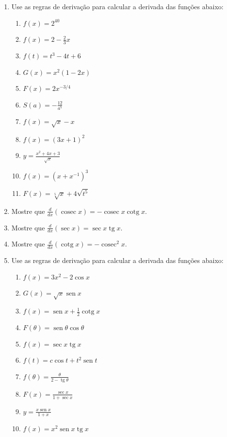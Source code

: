 \documentclass[a4paper]{article}
\DeclareMathOperator{\sen}{sen}
\DeclareMathOperator{\tg}{tg}
\DeclareMathOperator{\cotg}{cotg}
\DeclareMathOperator{\cosec}{cosec}
\newcommand{\ds}{\displaystyle}
\begin{document}
%
%
\begin{enumerate}
    \vspace{0.5cm}
    \item Use as regras de deriva\c{c}\~ao para calcular a derivada das fun\c{c}\~oes abaixo:

        \begin{enumerate}
            \item $f(x)=2^{40}$
            \item $f(x)=2-\frac{2}{3}x$
            \item $f(t)=t^3-4t+6$
            \item $G(x)=x^2(1-2x)$
            \item $F(x)=2x^{-3/4}$
            \item $S(a)=-\frac{12}{a^5}$
            \item $f(x)=\sqrt{x}-x$
            \item $f(x)=(3x+1)^2$
            \item $y=\ds\frac{x^2+4x+3}{\sqrt{x}}$
            \item $f(x)=(x+x^{-1})^3$
            \item $F(x)=\sqrt[5]{x}+4\sqrt{t^5}$
        \end{enumerate}

    \vspace{0.5cm}
    \item Mostre que $\ds\frac{d}{dx}(\cosec{x}) = -\cosec{x} \cotg{x}$.

    \vspace{0.5cm}
    \item Mostre que $\ds\frac{d}{dx}(\sec{x}) = \sec{x}\tg{x}$.

    \vspace{0.5cm}
    \item Mostre que $\ds\frac{d}{dx}(\cotg{x}) = -\cosec^2{x}$.

    \vspace{0.5cm}
    \item Use as regras de deriva\c{c}\~ao para calcular a derivada das fun\c{c}\~oes abaixo:

        \begin{enumerate}
            \item $f(x)=3x^2-2\cos{x}$
            \item $G(x)=\sqrt{x}\sen{x}$
            \item $f(x)=\sen{x}+\frac{1}{2}\cotg{x}$
            \item $F(\theta)=\sen{\theta}\cos{\theta}$
            \item $f(x)=\sec{x}\tg{x}$
            \item $f(t)=c\cos{t}+t^2\sen{t}$
            \item $f(\theta)=\ds\frac{\theta}{2-\tg{\theta}}$
            \item $F(x)=\ds\frac{\sec{x}}{1+\sec{x}}$
            \item $y=\ds\frac{x\sen{x}}{1+x}$
            \item $f(x)=x^2\sen{x}\tg{x}$
        \end{enumerate}

\end{enumerate}
\end{document}
